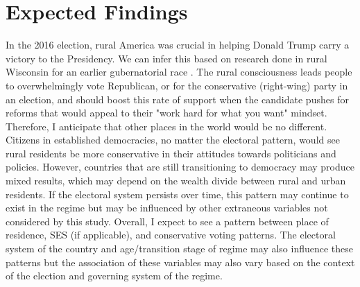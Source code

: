 \documentclass[12pt]{article}
\begin{document}
\section{Expected Findings}

In the 2016 election, rural America was crucial in helping Donald Trump carry a victory to the Presidency. We can infer this based on research done in rural Wisconsin for an earlier gubernatorial race \citep{walsh_putting_2012}. The rural consciousness leads people to overwhelmingly vote Republican, or for the conservative (right-wing) party in an election, and should boost this rate of support when the candidate pushes for reforms that would appeal to their "work hard for what you want" mindset. Therefore, I anticipate that other places in the world would be no different. Citizens in established democracies, no matter the electoral pattern, would see rural residents be more conservative in their attitudes towards politicians and policies. However, countries that are still transitioning to democracy may produce mixed results, which may depend on the wealth divide between rural and urban residents. If the electoral system persists over time, this pattern may continue to exist in the regime but may be influenced by other extraneous variables not considered by this study. Overall, I expect to see a pattern between place of residence, SES (if applicable), and conservative voting patterns. The electoral system of the country and age/transition stage of regime may also influence these patterns but the association of these variables may also vary based on the context of the election and governing system of the regime.
\end{document}
